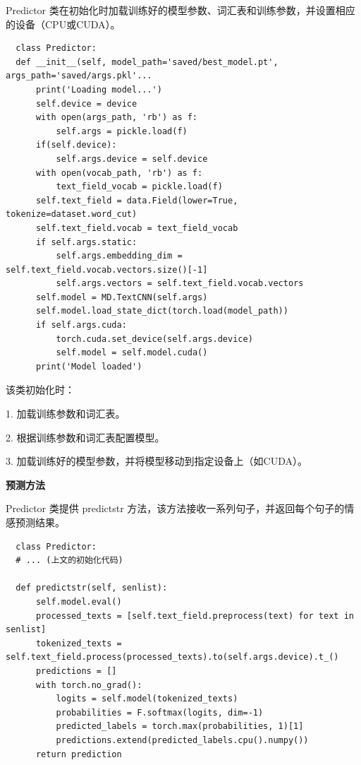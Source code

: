 \documentclass[UTF8,a4paper,15pt,titlepage,oneside]{ctexbook}
\begin{document}
Predictor 类在初始化时加载训练好的模型参数、词汇表和训练参数，并设置相应的设备（CPU或CUDA）。


\begin{mdframed}[backgroundcolor=darkgray, linecolor=lightgray, linewidth=1pt, innermargin=0.5cm, outermargin=0.5cm, skipbelow=0.1cm]
  \color{white}
  \begin{verbatim}
  class Predictor:
  def __init__(self, model_path='saved/best_model.pt', args_path='saved/args.pkl'...
      print('Loading model...')
      self.device = device
      with open(args_path, 'rb') as f:
          self.args = pickle.load(f)
      if(self.device):
          self.args.device = self.device
      with open(vocab_path, 'rb') as f:
          text_field_vocab = pickle.load(f)
      self.text_field = data.Field(lower=True, tokenize=dataset.word_cut)
      self.text_field.vocab = text_field_vocab
      if self.args.static:
          self.args.embedding_dim = self.text_field.vocab.vectors.size()[-1]
          self.args.vectors = self.text_field.vocab.vectors
      self.model = MD.TextCNN(self.args)
      self.model.load_state_dict(torch.load(model_path))
      if self.args.cuda:
          torch.cuda.set_device(self.args.device)
          self.model = self.model.cuda()
      print('Model loaded')
\end{verbatim}  
\end{mdframed}

该类初始化时：

1. 加载训练参数和词汇表。

2. 根据训练参数和词汇表配置模型。

3. 加载训练好的模型参数，并将模型移动到指定设备上（如CUDA）。

\vskip 0.2cm
\noindent
\textbf{预测方法}

Predictor 类提供 predictstr 方法，该方法接收一系列句子，并返回每个句子的情感预测结果。

\begin{mdframed}[backgroundcolor=darkgray, linecolor=lightgray, linewidth=1pt, innermargin=0.5cm, outermargin=0.5cm, skipbelow=0.1cm]
  \color{white}
  \begin{verbatim}
  class Predictor:
  # ... (上文的初始化代码)

  def predictstr(self, senlist):
      self.model.eval()
      processed_texts = [self.text_field.preprocess(text) for text in senlist]
      tokenized_texts = self.text_field.process(processed_texts).to(self.args.device).t_()
      predictions = []
      with torch.no_grad():
          logits = self.model(tokenized_texts)
          probabilities = F.softmax(logits, dim=-1)
          predicted_labels = torch.max(probabilities, 1)[1]
          predictions.extend(predicted_labels.cpu().numpy())
      return prediction
\end{verbatim}  
\end{mdframed}
\end{document}
